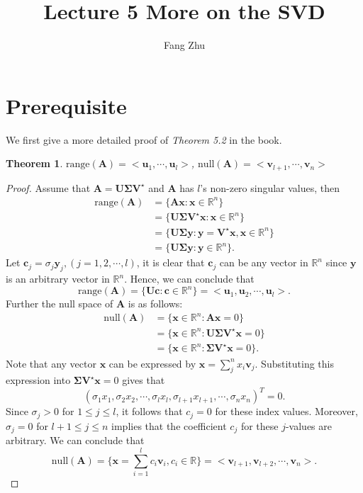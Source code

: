 \documentclass{article}
\author{Fang Zhu}
\title{Lecture 5 More on the SVD}
\newtheorem{theorem}{Theorem}[section]
\begin{document}
	\maketitle
	
\section{Prerequisite}
We first give a more detailed proof of \textit{Theorem 5.2} in the book.
\begin{theorem}
$\mathrm{range} (\bm{A}) = <\bm{u}_1, \cdots, \bm{u}_l>$, $\mathrm{null} (\bm{A}) = <\bm{v}_{l+1}, \cdots, \bm{v}_{n}>$
\end{theorem}

\begin{proof}
Assume that $\bm{A} = \bm{U} \bm{\Sigma} \bm{V}^{\star}$ and $\bm{A}$ has $l$'s non-zero
singular values, then
$$
\begin{aligned}
\mathrm{range} (\bm{A}) & = \{ \bm{Ax}: \bm{x} \in \mathbb{R}^{n}\} \\
& = \{ \bm{U} \bm{\Sigma} \bm{V}^{\star}\bm{x}: \bm{x} \in \mathbb{R}^{n}\} \\
& = \{ \bm{U} \bm{\Sigma}  \bm{y}: \bm{y} = \bm{V}^{\star}\bm{x}, \bm{x} \in \mathbb{R}^{n}\} \\
& = \{ \bm{U} \bm{\Sigma} \bm{y}: \bm{y} \in \mathbb{R}^{n}\}.
\end{aligned}
$$
Let $\bm{c}_j  = \sigma_j \bm{y}_j, (j = 1, 2, \cdots, l)$, it is clear that $\bm{c}_j$ can be any vector in $\mathbb{R}^n$ since $\bm{y}$ is an arbitrary vector in $\mathbb{R}^n$. Hence, we can conclude that
$$
\mathrm{range}(\bm{A}) = \{ \bm{U} \bm{c}: \bm{c} \in \mathbb{R}^n \} = <\bm{u}_1, \bm{u}_2, \cdots, \bm{u}_l>.
$$
Further the null space of $\bm{A}$ is as follows:
$$
\begin{aligned}
    \mathrm{null}( \bm{A} )&= \{ \bm{x} \in \mathbb{R}^n: \bm{Ax} = 0\} \\
    & = \{ \bm{x} \in \mathbb{R}^n: \bm{U} \bm{\Sigma} \bm{V}^{\star}\bm{x} = 0\} \\
    & = \{ \bm{x} \in \mathbb{R}^n: \bm{\Sigma} \bm{V}^{\star}\bm{x} = 0\}.
\end{aligned}
$$
Note that any vector $\bm{x}$ can be expressed by $\bm{x} = \sum_{j}^{n} x_i \bm{v}_j$. Substituting this expression into $\bm{\Sigma} \bm{V}^{\star}\bm{x} = 0$ gives that
$$
(\sigma_1 x_1, \sigma_2 x_2, \cdots, \sigma_l x_l, \sigma_{l+1} x_{l+1}, \cdots, \sigma_n x_n)^T = 0.
$$
Since $\sigma_j > 0$ for $1 \leq j \leq l$, it follows that $c_j = 0$ for these index values. Moreover, $\sigma_j = 0$ for $l+1 \leq j \leq n$ implies that the coefficient $c_j$ for these $j$-values are arbitrary. We can conclude that
$$
\mathrm{null} (\bm{A}) = \{ \bm{x} = \sum_{i=1}^l c_i \bm{v}_i, c_i \in \mathbb{R}\} = <\bm{v}_{l+1}, \bm{v}_{l+2}, \cdots, \bm{v}_n>.
$$
\end{proof}
\end{document}
